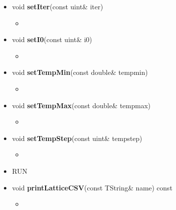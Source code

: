 \begin{itemize}
\begin{itemize}
			\item[]	void \textbf{setIter}(const uint\& \textunderscore iter)
			\begin{itemize}
				\item[]
			\end{itemize}

			\item[] void \textbf{setI0}(const uint\& \textunderscore i0)
			\begin{itemize}
				\item[]
			\end{itemize}

			\item[] void \textbf{setTempMin}(const double\& \textunderscore tempmin)
			\begin{itemize}
				\item[]
			\end{itemize}

			\item[] void \textbf{setTempMax}(const double\& \textunderscore tempmax)
			\begin{itemize}
				\item[]
			\end{itemize}

			\item[] void \textbf{setTempStep}(const uint\& \textunderscore tempstep)
			\begin{itemize}
				\item[]
			\end{itemize}




		\item[] RUN \\

			\item[] void \textbf{printLatticeCSV}(const TString\& name) const
			\begin{itemize}
				\item[]
			\end{itemize}

	\end{itemize}


\end{itemize}


